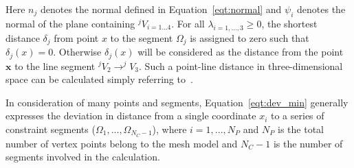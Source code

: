 Here $n_j$ denotes the normal defined in Equation~\ref{eqt:normal} and $\psi_i$ denotes the normal of the plane containing $^jV_{i=1...4}$.
For all $\lambda_{i=1,...,3} \ge 0$, the shortest distance $\delta_j$ from point $x$ to the segment $\Omega_j$ is assigned to zero such that $\delta_j(x)=0$.
Otherwise $\delta_j(x)$ will be considered as the distance from the point $\boldsymbol{x}$ to the line segment $^jV_2 \rightarrow ^jV_3$.
Such a point-line distance in three-dimensional space can be calculated simply referring to~\cite{weisstein}.

In consideration of many points and segments, Equation~\ref{eqt:dev_min} generally expresses the deviation in distance from a single coordinate $x_i$ to a series of constraint segments ($\Omega_{1},...,\Omega_{N_C-1}$), where $i=1,...,N_P$ and $N_P$ is the total number of vertex points belong to the mesh model and $N_C-1$ is the number of segments involved in the calculation.






